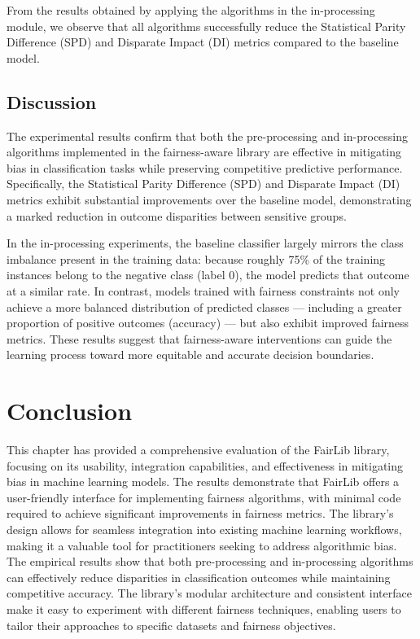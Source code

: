 \documentclass[12pt,a4paper,openright,twoside]{book}
\begin{document}
From the results obtained by applying the algorithms in the in-processing module, we observe that all algorithms successfully reduce the Statistical Parity Difference (SPD) and Disparate Impact (DI) metrics compared to the baseline model. 

\subsection{Discussion}
The experimental results confirm that both the pre-processing and in-processing algorithms implemented in the fairness-aware library are effective in mitigating bias in classification tasks while preserving competitive predictive performance. Specifically, the Statistical Parity Difference (SPD) and Disparate Impact (DI) metrics exhibit substantial improvements over the baseline model, demonstrating a marked reduction in outcome disparities between sensitive groups.

In the in-processing experiments, the baseline classifier largely mirrors the class imbalance present in the training data: because roughly 75\% of the training instances belong to the negative class (label 0), the model predicts that outcome at a similar rate. In contrast, models trained with fairness constraints not only achieve a more balanced distribution of predicted classes — including a greater proportion of positive outcomes (accuracy) — but also exhibit improved fairness metrics. These results suggest that fairness-aware interventions can guide the learning process toward more equitable and accurate decision boundaries.


\section{Conclusion}
This chapter has provided a comprehensive evaluation of the FairLib library, focusing on its usability, integration capabilities, and effectiveness in mitigating bias in machine learning models. The results demonstrate that FairLib offers a user-friendly interface for implementing fairness algorithms, with minimal code required to achieve significant improvements in fairness metrics. The library's design allows for seamless integration into existing machine learning workflows, making it a valuable tool for practitioners seeking to address algorithmic bias. The empirical results show that both pre-processing and in-processing algorithms can effectively reduce disparities in classification outcomes while maintaining competitive accuracy. The library's modular architecture and consistent interface make it easy to experiment with different fairness techniques, enabling users to tailor their approaches to specific datasets and fairness objectives.
\end{document}
